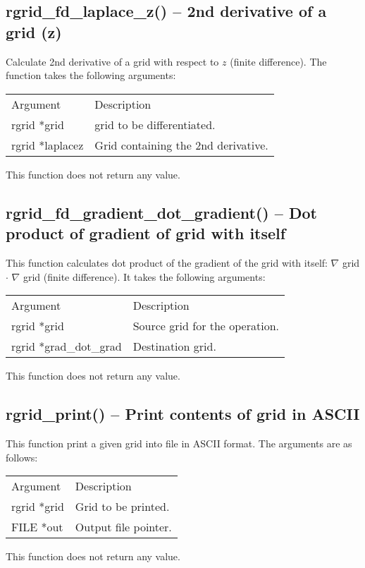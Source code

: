 \documentclass[12pt,letterpaper]{report}
\begin{document}
\subsection{rgrid\_fd\_laplace\_z() -- 2nd derivative of a grid (z)}

Calculate 2nd derivative of a grid with respect to $z$ (finite difference). The function takes the following arguments:
\begin{longtable}{p{} p{}}
Argument & Description\\
\cline{1-2}
rgrid *grid & grid to be differentiated.\\
rgrid *laplacez & Grid containing the 2nd derivative.\\
\end{longtable}
\noindent
This function does not return any value.

\subsection{rgrid\_fd\_gradient\_dot\_gradient() -- Dot product of gradient of grid with itself}

This function calculates dot product of the gradient of the grid with itself: $\nabla$ grid $\cdot$ $\nabla$ grid (finite difference). It takes the following arguments:
\begin{longtable}{p{} p{}}
Argument & Description\\
\cline{1-2}
rgrid *grid  & Source grid for the operation.\\
rgrid *grad\_dot\_grad & Destination grid.\\
\end{longtable}
\noindent
This function does not return any value.

\subsection{rgrid\_print() -- Print contents of grid in ASCII}

This function print a given grid into file in ASCII format. The arguments are as follows:
\begin{longtable}{p{} p{}}
Argument & Description\\
\cline{1-2}
rgrid *grid & Grid to be printed.\\
FILE *out & Output file pointer.\\
\end{longtable}
\noindent
This function does not return any value.
\end{document}
